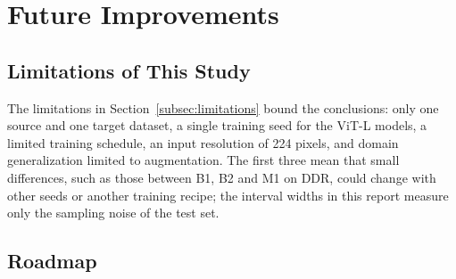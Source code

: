 \section{Future Improvements}
\label{sec:future_improvements}

\subsection{Limitations of This Study}
\label{subsec:limits_summary}

The limitations in Section~\ref{subsec:limitations} bound the conclusions: only one source and one target dataset, a single training seed for the ViT-L models, a limited training schedule, an input resolution of 224 pixels, and domain generalization limited to augmentation. The first three mean that small differences, such as those between B1, B2 and M1 on DDR, could change with other seeds or another training recipe; the interval widths in this report measure only the sampling noise of the test set.

\subsection{Roadmap}
\label{subsec:roadmap}

